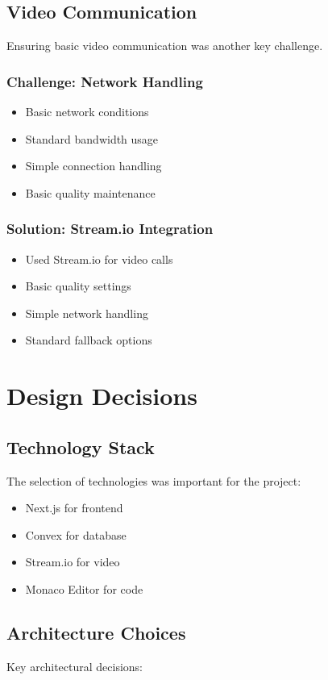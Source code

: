 \documentclass[12pt,a4paper]{report}
\begin{document}
\subsection{Video Communication}
Ensuring basic video communication was another key challenge.

\subsubsection{Challenge: Network Handling}
\begin{itemize}
   \item Basic network conditions
   \item Standard bandwidth usage
   \item Simple connection handling
   \item Basic quality maintenance
\end{itemize}

\subsubsection{Solution: Stream.io Integration}
\begin{itemize}
   \item Used Stream.io for video calls
   \item Basic quality settings
   \item Simple network handling
   \item Standard fallback options
\end{itemize}

\section{Design Decisions}

\subsection{Technology Stack}
The selection of technologies was important for the project:

\begin{itemize}
   \item Next.js for frontend
   \item Convex for database
   \item Stream.io for video
   \item Monaco Editor for code
\end{itemize}

\subsection{Architecture Choices}
Key architectural decisions:
\end{document}
